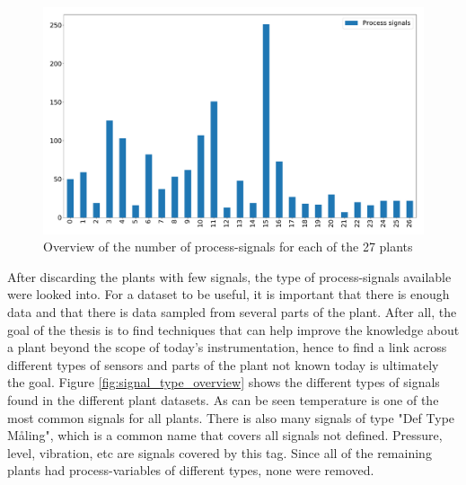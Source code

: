         \begin{figure}[h]
            \centering
            \includegraphics[width=\textwidth]{report/figures/data/plant_process_signals_overview.pdf}
            \caption{Overview of the number of process-signals for each of the 27 plants}
            \label{fig:process_signal_overview}
        \end{figure}
        
        After discarding the plants with few signals, the type of process-signals available were looked into. For a dataset to be useful, it is important that there is enough data and that there is data sampled from several parts of the plant. After all, the goal of the thesis is to find techniques that can help improve the knowledge about a plant beyond the scope of today's instrumentation, hence to find a link across different types of sensors and parts of the plant not known today is ultimately the goal. Figure \ref{fig:signal_type_overview} shows the different types of signals found in the different plant datasets. As can be seen temperature is one of the most common signals for all plants. There is also many signals of type "Def Type Måling", which is a common name that covers all signals not defined. Pressure, level, vibration, etc are signals covered by this tag. Since all of the remaining plants had process-variables of different types, none were removed. 
        
